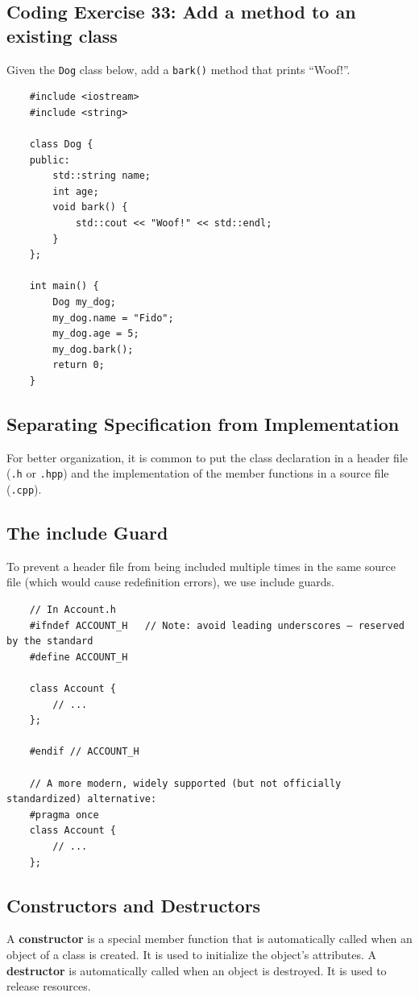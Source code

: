 \subsection{Coding Exercise 33: Add a method to an existing class}
Given the \texttt{Dog} class below, add a \texttt{bark()} method that prints ``Woof!''.
\begin{lstlisting}
	#include <iostream>
	#include <string>

	class Dog {
	public:
		std::string name;
		int age;
		void bark() {
			std::cout << "Woof!" << std::endl;
		}
	};

	int main() {
		Dog my_dog;
		my_dog.name = "Fido";
		my_dog.age = 5;
		my_dog.bark();
		return 0;
	}
\end{lstlisting}

\subsection{Separating Specification from Implementation}
For better organization, it is common to put the class declaration in a header file (\texttt{.h} or \texttt{.hpp}) and the implementation of the member functions in a source file (\texttt{.cpp}).

\subsection{The include Guard}
To prevent a header file from being included multiple times in the same source file (which would cause redefinition errors), we use include guards.
\begin{lstlisting}
	// In Account.h
	#ifndef ACCOUNT_H   // Note: avoid leading underscores — reserved by the standard
	#define ACCOUNT_H

	class Account {
		// ...
	};

	#endif // ACCOUNT_H

	// A more modern, widely supported (but not officially standardized) alternative:
	#pragma once
	class Account {
		// ...
	};
\end{lstlisting}

\subsection{Constructors and Destructors}
A \textbf{constructor} is a special member function that is automatically called when an object of a class is created. It is used to initialize the object's attributes. A \textbf{destructor} is automatically called when an object is destroyed. It is used to release resources.


